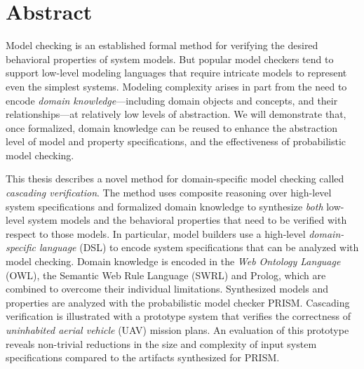 \chapter*{Abstract}

Model checking is an established formal method for verifying the desired behavioral properties of system models. But popular model checkers tend to support low-level modeling languages that require intricate models to represent even the simplest systems. Modeling complexity arises in part from the need to encode \emph{domain knowledge}---including domain objects and concepts, and their relationships---at relatively low levels of abstraction. We will demonstrate that, once formalized, domain knowledge can be reused to enhance the abstraction level of model and property specifications, and the effectiveness of probabilistic model checking.

This thesis describes a novel method for domain-specific model checking called \emph{cascading verification}. The method uses composite reasoning over high-level system specifications and formalized domain knowledge to synthesize \emph{both} low-level system models and the behavioral properties that need to be verified with respect to those models. In particular, model builders use a high-level \emph{domain-specific language} (DSL) to encode system specifications that can be analyzed with model checking. Domain knowledge is encoded in the \emph{Web Ontology Language} (OWL), the Semantic Web Rule Language (SWRL) and Prolog, which are combined to overcome their individual limitations. Synthesized models and properties are analyzed with the probabilistic model checker PRISM\@. Cascading verification is illustrated with a prototype system that verifies the correctness of \emph{uninhabited aerial vehicle} (UAV) mission plans. An evaluation of this prototype reveals non-trivial reductions in the size and complexity of input system specifications compared to the artifacts synthesized for PRISM\@.
